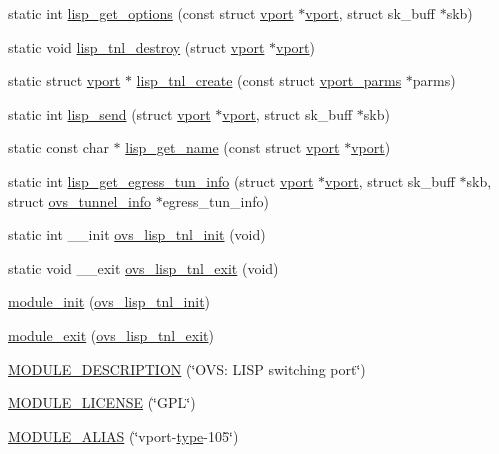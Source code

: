 \begin{DoxyCompactItemize}
\item 
static int \hyperlink{vport-lisp_8c_a54dce33d8291b4f7f816d882b13c3cc3}{lisp\+\_\+get\+\_\+options} (const struct \hyperlink{structvport}{vport} $\ast$\hyperlink{structvport}{vport}, struct sk\+\_\+buff $\ast$skb)
\item 
static void \hyperlink{vport-lisp_8c_a29757c9680cfc5547ff8b58fc9d39f57}{lisp\+\_\+tnl\+\_\+destroy} (struct \hyperlink{structvport}{vport} $\ast$\hyperlink{structvport}{vport})
\item 
static struct \hyperlink{structvport}{vport} $\ast$ \hyperlink{vport-lisp_8c_aeaf8548971b28354b0c5b67853008ebb}{lisp\+\_\+tnl\+\_\+create} (const struct \hyperlink{structvport__parms}{vport\+\_\+parms} $\ast$parms)
\item 
static int \hyperlink{vport-lisp_8c_a3a50252974d93009f1c1204799ef7ba0}{lisp\+\_\+send} (struct \hyperlink{structvport}{vport} $\ast$\hyperlink{structvport}{vport}, struct sk\+\_\+buff $\ast$skb)
\item 
static const char $\ast$ \hyperlink{vport-lisp_8c_a9b17408cfe8b9c4999729e709eda60c8}{lisp\+\_\+get\+\_\+name} (const struct \hyperlink{structvport}{vport} $\ast$\hyperlink{structvport}{vport})
\item 
static int \hyperlink{vport-lisp_8c_a38f0b18b384c833b501a23e942fa2a07}{lisp\+\_\+get\+\_\+egress\+\_\+tun\+\_\+info} (struct \hyperlink{structvport}{vport} $\ast$\hyperlink{structvport}{vport}, struct sk\+\_\+buff $\ast$skb, struct \hyperlink{structovs__tunnel__info}{ovs\+\_\+tunnel\+\_\+info} $\ast$egress\+\_\+tun\+\_\+info)
\item 
static int \+\_\+\+\_\+init \hyperlink{vport-lisp_8c_a2796063074f5d672bb389e375b744a7f}{ovs\+\_\+lisp\+\_\+tnl\+\_\+init} (void)
\item 
static void \+\_\+\+\_\+exit \hyperlink{vport-lisp_8c_ad76ba8664a548e29a850c62273297c6d}{ovs\+\_\+lisp\+\_\+tnl\+\_\+exit} (void)
\item 
\hyperlink{vport-lisp_8c_a94a5f96f1e47f7598c585bbf70bfe00f}{module\+\_\+init} (\hyperlink{vport-lisp_8c_a2796063074f5d672bb389e375b744a7f}{ovs\+\_\+lisp\+\_\+tnl\+\_\+init})
\item 
\hyperlink{vport-lisp_8c_a4ead3dc5abdbbff6d567af19f9eec979}{module\+\_\+exit} (\hyperlink{vport-lisp_8c_ad76ba8664a548e29a850c62273297c6d}{ovs\+\_\+lisp\+\_\+tnl\+\_\+exit})
\item 
\hyperlink{vport-lisp_8c_aa7521a419702060baceb5ba5fc1ec8c7}{M\+O\+D\+U\+L\+E\+\_\+\+D\+E\+S\+C\+R\+I\+P\+T\+I\+O\+N} (\char`\"{}O\+V\+S\+: L\+I\+S\+P switching port\char`\"{})
\item 
\hyperlink{vport-lisp_8c_ad94b36675e7eb067ea3ce6ff9e244a44}{M\+O\+D\+U\+L\+E\+\_\+\+L\+I\+C\+E\+N\+S\+E} (\char`\"{}G\+P\+L\char`\"{})
\item 
\hyperlink{vport-lisp_8c_a8b3ea9759357bb282812b0925b450fa1}{M\+O\+D\+U\+L\+E\+\_\+\+A\+L\+I\+A\+S} (\char`\"{}vport-\/\hyperlink{flow_8h_ab22aaab04f806700def00f32823fcb9e}{type}-\/105\char`\"{})
\end{DoxyCompactItemize}



